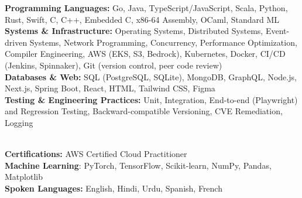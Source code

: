\begin{itemize}[leftmargin=0in, label={}]
	\scriptsize{
	\item{
	      \textbf{Programming Languages:}
	      Go, Java, TypeScript/JavaScript, Scala, Python, Rust, Swift, C, C++, Embedded C, x86-64 Assembly, OCaml, Standard ML \\
	      \textbf{Systems \& Infrastructure:}
	      Operating Systems, Distributed Systems, Event-driven Systems, Network Programming,
	      Concurrency, Performance Optimization, Compiler Engineering,
	      AWS (EKS, S3, Bedrock), Kubernetes, Docker, CI/CD (Jenkins, Spinnaker), Git (version control, peer code review) \\
	      \textbf{Databases \& Web:}
	      SQL (PostgreSQL, SQLite), MongoDB, GraphQL, Node.js, Next.js, Spring Boot, React, HTML, Tailwind CSS, Figma \\
	      \textbf{Testing \& Engineering Practices:}
	      Unit, Integration, End-to-end (Playwright) and Regression Testing, Backward-compatible Versioning, CVE Remediation, Logging
	      }} \\
	      \textbf{Certifications:}
	      AWS Certified Cloud Practitioner \\
	      \textbf{Machine Learning}:
	      PyTorch, TensorFlow, Scikit-learn, NumPy, Pandas, Matplotlib \\
	      \textbf{Spoken Languages:}
	      English, Hindi, Urdu, Spanish, French \\

\end{itemize}